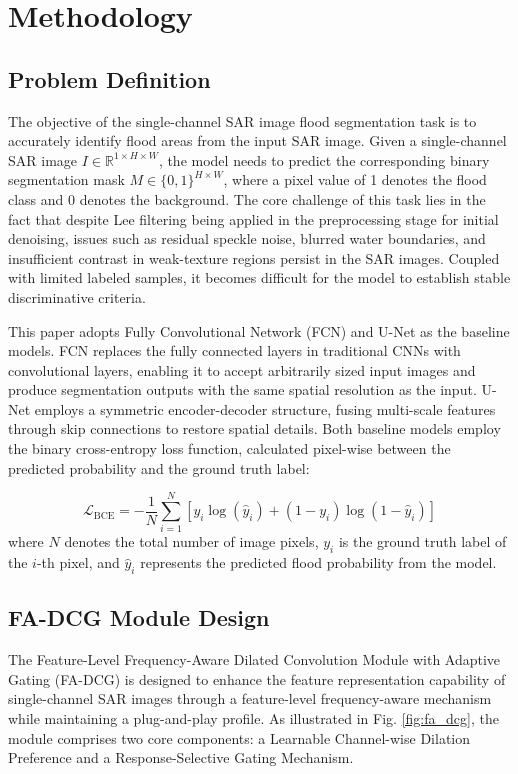 \documentclass[lettersize,journal]{IEEEtran}
\begin{document}
\section{Methodology}

\subsection{Problem Definition}

The objective of the single-channel SAR image flood segmentation task is to accurately identify flood areas from the input SAR image. Given a single-channel SAR image $I \in \mathbb{R}^{1 \times H \times W}$, the model needs to predict the corresponding binary segmentation mask $M \in \{0,1\}^{H \times W}$, where a pixel value of 1 denotes the flood class and 0 denotes the background. The core challenge of this task lies in the fact that despite Lee filtering being applied in the preprocessing stage for initial denoising, issues such as residual speckle noise, blurred water boundaries, and insufficient contrast in weak-texture regions persist in the SAR images. Coupled with limited labeled samples, it becomes difficult for the model to establish stable discriminative criteria.

This paper adopts Fully Convolutional Network (FCN) and U-Net as the baseline models. FCN replaces the fully connected layers in traditional CNNs with convolutional layers, enabling it to accept arbitrarily sized input images and produce segmentation outputs with the same spatial resolution as the input. U-Net employs a symmetric encoder-decoder structure, fusing multi-scale features through skip connections to restore spatial details. Both baseline models employ the binary cross-entropy loss function, calculated pixel-wise between the predicted probability and the ground truth label:

\begin{equation}
\mathcal{L}_{\text{BCE}} = -\frac{1}{N}\sum_{i=1}^{N}\left[y_i \log(\hat{y}_i) + (1-y_i)\log(1-\hat{y}_i)\right]
\end{equation}
where $N$ denotes the total number of image pixels, $y_i$ is the ground truth label of the $i$-th pixel, and $\hat{y}_i$ represents the predicted flood probability from the model.

\subsection{FA-DCG Module Design}

The Feature-Level Frequency-Aware Dilated Convolution Module with Adaptive Gating (FA-DCG) is designed to enhance the feature representation capability of single-channel SAR images through a feature-level frequency-aware mechanism while maintaining a plug-and-play profile. As illustrated in Fig. \ref{fig:fa_dcg}, the module comprises two core components: a Learnable Channel-wise Dilation Preference and a Response-Selective Gating Mechanism.
\end{document}
